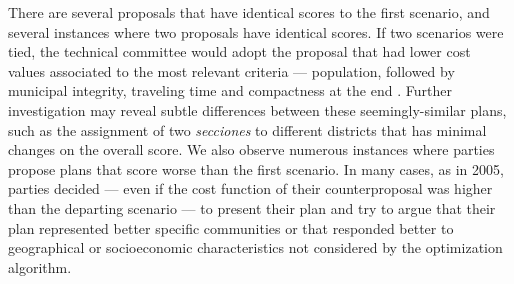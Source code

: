 \documentclass[letter,12pt]{article}
\begin{document}

There are several proposals that have identical scores to the first scenario, and several instances where two proposals have identical scores. If two scenarios were tied, the technical committee would adopt the proposal that had lower cost values associated to the most relevant criteria --- population, followed by municipal integrity, traveling time and compactness at the end \citep{acuerdoife2013}. Further investigation may reveal subtle differences between these seemingly-similar plans, such as the assignment of two \emph{secciones} to different districts that has minimal changes on the overall score. We also observe numerous instances where parties propose plans that score worse than the first scenario. In many cases, as in 2005, parties decided --- even if the cost function of their counterproposal was higher than the departing scenario --- to present their plan and try to argue that their plan represented better specific communities or that responded better to geographical or socioeconomic characteristics not considered by the optimization algorithm.
\end{document}
